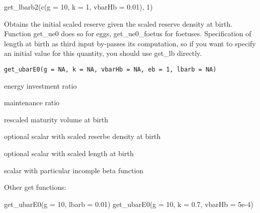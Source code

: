 \documentclass[a4paper]{book}
\begin{document}
\begin{Examples}
\begin{ExampleCode}
get_lbarb2(c(g = 10, k = 1, vbarHb = 0.01), 1)
\end{ExampleCode}
\end{Examples}
%
\begin{Description}\relax
Obtains the initial scaled reserve given the scaled reserve density at birth.
Function get\_ue0 does so for eggs, get\_ue0\_foetus for foetuses.
Specification of length at birth as third input by-passes its computation,
so if you want to specify an initial value for this quantity, you should use get\_lb directly.
\end{Description}
%
\begin{Usage}
\begin{verbatim}
get_ubarE0(g = NA, k = NA, vbarHb = NA, eb = 1, lbarb = NA)
\end{verbatim}
\end{Usage}
%
\begin{Arguments}
\begin{ldescription}
\item[\code{g}] energy investment ratio

\item[\code{k}] maintenance ratio

\item[\code{vbarHb}] rescaled maturity volume at birth

\item[\code{eb}] optional scalar with scaled reserbe density at birth

\item[\code{lbarb}] optional scalar with scaled length at birth
\end{ldescription}
\end{Arguments}
%
\begin{Value}
scalar with particular incomple beta function
\end{Value}
%
\begin{SeeAlso}\relax
Other get functions: 
\end{SeeAlso}
%
\begin{Examples}
\begin{ExampleCode}
get_ubarE0(g = 10, lbarb = 0.01)
get_ubarE0(g = 10, k = 0.7, vbarHb = 5e-4)
\end{ExampleCode}
\end{Examples}
\end{document}
